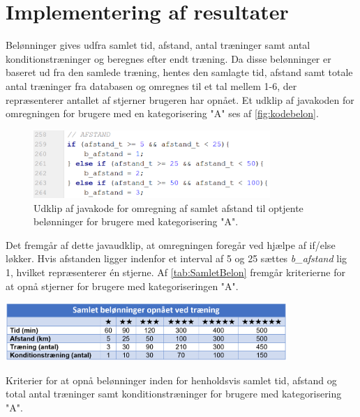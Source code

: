 \section{Implementering af resultater}
Belønninger gives udfra samlet tid, afstand, antal træninger samt antal konditionstræninger og beregnes efter endt træning. Da disse belønninger er baseret ud fra den samlede træning, hentes den samlagte tid, afstand samt totale antal træninger fra databasen og omregnes til et tal mellem 1-6, der repræsenterer antallet af stjerner brugeren har opnået. Et udklip af javakoden for omregningen for brugere med en kategorisering "A" ses af \autoref{fig:kodebelon}.

\begin{figure} [H]
\centering
\includegraphics[width=0.8\textwidth]{figures/imple/kodebelon}
\caption{Udklip af javakode for omregning af samlet afstand til optjente belønninger for brugere med kategorisering "A".}
\label{fig:kodebelon}
\end{figure} 

\noindent
Det fremgår af dette javaudklip, at omregningen foregår ved hjælpe af if/else løkker. Hvis afstanden ligger indenfor et interval af 5 og 25 sættes \textit{b\_afstand} lig 1, hvilket repræsenterer én stjerne. Af \autoref{tab:SamletBelon} fremgår kriterierne for at opnå stjerner for brugere med kategoriseringen "A".  

\begin{table}[H]
\centering
\includegraphics[width=0.8\textwidth]{figures/imple/SamletBelon}
\caption{Kriterier for at opnå belønninger inden for henholdsvis samlet tid, afstand og total antal træninger samt konditionstræninger for brugere med kategorisering "A".}
\label{tab:SamletBelon}
\end{table}  
